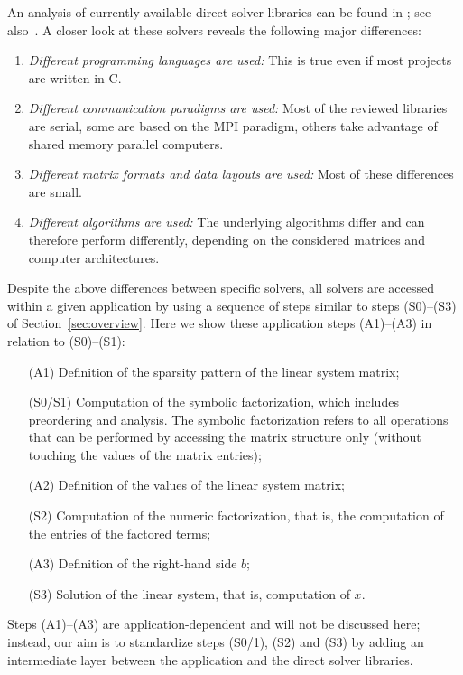 \documentclass[acmtoms,acmnow]{acmtrans2m}
\begin{document}
An analysis of currently available direct solver libraries can be found
in \cite[Section 8.6]{davis06direct}; see also~\cite[Section 6.7]{dongarra98numerical}.
A closer look at these solvers reveals the following major
differences:
\begin{enumerate}
\item {\sl Different programming languages are used:} This is true even if most projects are
written in C.

\item {\sl Different communication paradigms are used:}
 Most of the reviewed libraries are serial, some are based on the MPI
 paradigm, others take advantage of shared memory parallel computers.

\item {\sl Different matrix formats and data layouts are used:}
Most of these differences are small.

\item {\sl Different algorithms are used:} The underlying algorithms differ
and can therefore perform differently, depending on the considered matrices and
computer architectures.

\end{enumerate}

Despite the above differences between specific solvers, all solvers
are accessed within a given application by using a sequence of steps
similar to steps (S0)--(S3) of Section~\ref{sec:overview}.  Here we
show these application steps (A1)--(A3) in relation to (S0)--(S1):
\begin{enumerate}
\item[(A1)] Definition of the sparsity pattern of the linear system matrix;
\item[(S0/S1)] Computation of the symbolic factorization, which includes
preordering and analysis. The
symbolic factorization refers to all operations that can be performed by
accessing the matrix structure only (without touching the values of the matrix entries);
\item[(A2)] Definition of the values of the linear system matrix;
\item[(S2)] Computation of the numeric factorization, that is, the computation
of the entries of the factored terms;
\item[(A3)] Definition of the right-hand side $b$;
\item[(S3)] Solution of the linear system, that is, computation of $x$.
\end{enumerate}
Steps (A1)--(A3) are application-dependent and will not be discussed
here; instead, our aim is to standardize steps (S0/1), (S2) and (S3)
by adding an intermediate layer between the application and the
direct solver libraries.
\end{document}
